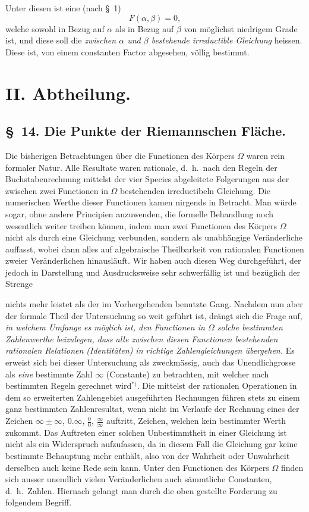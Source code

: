 \documentclass{article}
\begin{document}
Unter diesen ist eine (nach §~1)
\[ F(\alpha, \beta) = 0, \]
welche sowohl in Bezug auf $\alpha$ als in Bezug auf $\beta$ von möglichst niedrigem Grade ist, und diese soll die \emph{zwischen $\alpha$ und $\beta$ bestehende irreductible Gleichung} heissen. Diese ist, von einem constanten Factor abgesehen, völlig bestimmt.

\section*{II. Abtheilung.}

\subsection*{§~14. Die Punkte der Riemannschen Fläche.}

Die bisherigen Betrachtungen über die Functionen des Körpers $\Omega$ waren rein formaler Natur. Alle Resultate waren rationale, d.\ h.\ nach den Regeln der Buchstabenrechnung mittelst der vier Species abgeleitete Folgerungen aus der zwischen zwei Functionen in $\Omega$ bestehenden irreductibeln Gleichung. Die numerischen Werthe dieser Functionen kamen nirgends in Betracht. Man würde sogar, ohne andere Principien anzuwenden, die formelle Behandlung noch wesentlich weiter treiben können, indem man zwei Functionen des Körpers $\Omega$ nicht als durch eine Gleichung verbunden, sondern als unabhängige Veränderliche auffasst, wobei dann alles auf algebraische Theilbarkeit von rationalen Functionen zweier Veränderlichen hinausläuft. Wir haben auch diesen Weg durchgeführt, der jedoch in Darstellung und Ausdrucksweise sehr schwerfällig ist und bezüglich der Strenge

nichts mehr leistet als der im Vorhergehenden benutzte Gang. Nachdem nun aber der formale Theil der Untersuchung so weit geführt ist, drängt sich die Frage auf, \emph{in welchem Umfange es möglich ist, den Functionen in $\Omega$ solche bestimmten Zahlenwerthe beizulegen, dass alle zwischen diesen Functionen bestehenden rationalen Relationen (Identitäten) in richtige Zahlengleichungen übergehen.} Es erweist sich bei dieser Untersuchung als zweckmässig, auch das Unendlichgrosse als \emph{eine} bestimmte Zahl $\infty$ (Constante) zu betrachten, mit welcher nach bestimmten Regeln gerechnet wird${}^{*)}$. Die mittelst der rationalen Operationen in dem so erweiterten Zahlengebiet ausgeführten Rechnungen führen stets zu einem ganz bestimmten Zahlenresultat, wenn nicht im Verlaufe der Rechnung eines der Zeichen $\infty \pm \infty$, $0.\infty$, $\frac{0}{0}$, $\frac{\infty}{\infty}$ auftritt, Zeichen, welchen kein bestimmter Werth zukommt. Das Auftreten einer solchen Unbestimmtheit in einer Gleichung ist nicht als ein Widerspruch aufzufassen, da in diesem Fall die Gleichung gar keine bestimmte Behauptung mehr enthält, also von der Wahrheit oder Unwahrheit derselben auch keine Rede sein kann. Unter den Functionen des Körpers $\Omega$ finden sich ausser unendlich vielen Veränderlichen auch sämmtliche Constanten, d.\ h.\ Zahlen. Hiernach gelangt man durch die oben gestellte Forderung zu folgendem Begriff.
\end{document}
